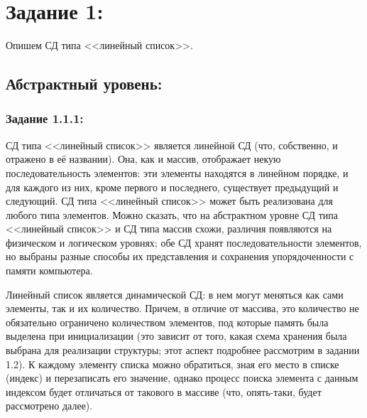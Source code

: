 \documentclass[12pt]{article}
\begin{document}
	\setcounter{secnumdepth}{-1} 
	\tableofcontents
	\newpage
	
	{\parskip=0.15cm
	
	\section{Задание 1:}
	\label{task_1}
	Опишем СД типа <<линейный список>>.
	
	\subsection{Абстрактный уровень:}
	\label{task_1_1}
	\subsubsection{Задание 1.1.1:}
	\label{task_1_1_1}
	
	СД типа <<линейный список>> является линейной СД (что, собственно, и отражено в её названии). Она, как и массив, отображает некую последовательность элементов: эти элементы находятся в линейном порядке, и для каждого из них, кроме первого и последнего, существует предыдущий и следующий. СД типа <<линейный список>> может быть реализована для любого типа элементов. Можно сказать, что на абстрактном уровне СД типа <<линейный список>> и СД типа массив схожи, различия появляются на физическом и логическом уровнях; обе СД хранят последовательности элементов, но выбраны разные способы их представления и сохранения упорядоченности с памяти компьютера. 
	
	Линейный список является динамической СД: в нем могут меняться как сами элементы, так и их количество. Причем, в отличие от массива, это количество не обязательно ограничено количеством элементов, под которые память была выделена при инициализации (это зависит от того, какая схема хранения была выбрана для реализации структуры; этот аспект подробнее рассмотрим в задании 1.2). К каждому элементу списка можно обратиться, зная его место в списке (индекс) и перезаписать его значение, однако процесс поиска элемента с данным индексом будет отличаться от такового в массиве (что, опять-таки, будет рассмотрено далее).
	
}
\end{document}
